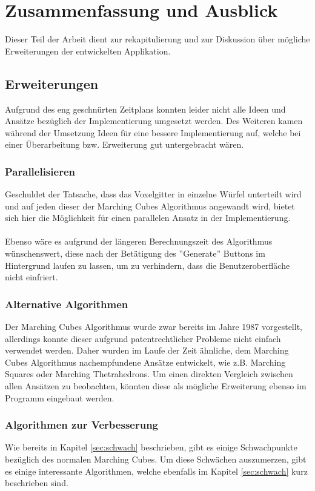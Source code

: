 \chapter{Zusammenfassung und Ausblick}
Dieser Teil der Arbeit dient zur rekapitulierung und zur Diskussion über mögliche Erweiterungen der entwickelten Applikation. 

\section{Erweiterungen}
Aufgrund des eng geschnürten Zeitplans konnten leider nicht alle Ideen und Ansätze bezüglich der Implementierung umgesetzt werden. Des Weiteren kamen während der Umsetzung Ideen für eine bessere Implementierung auf, welche bei einer Überarbeitung bzw. Erweiterung gut untergebracht wären.

\subsection{Parallelisieren}
Geschuldet der Tatsache, dass das Voxelgitter in einzelne Würfel unterteilt wird und auf jeden dieser der Marching Cubes Algorithmus angewandt wird, bietet sich hier die Möglichkeit für einen parallelen Ansatz in der Implementierung.\\
\\
Ebenso wäre es aufgrund der längeren Berechnungszeit des Algorithmus wünschenswert, diese nach der Betätigung des ''Generate'' Buttons im Hintergrund laufen zu lassen, um zu verhindern, dass die Benutzeroberfläche nicht einfriert.
\subsection{Alternative Algorithmen}
Der Marching Cubes Algorithmus wurde zwar bereits im Jahre 1987 vorgestellt, allerdings konnte dieser aufgrund patentrechtlicher Probleme nicht einfach verwendet werden. Daher wurden im Laufe der Zeit ähnliche, dem Marching Cubes Algorithmus nachempfundene Ansätze entwickelt, wie z.B. Marching Squares oder Marching Thetrahedrons. Um einen direkten Vergleich zwischen allen Ansätzen zu beobachten, könnten diese als mögliche Erweiterung ebenso im Programm eingebaut werden.
\subsection{Algorithmen zur Verbesserung} 
Wie bereits in Kapitel \ref{sec:schwach} beschrieben, gibt es einige Schwachpunkte bezüglich des normalen Marching Cubes. Um diese Schwächen auszumerzen, gibt es einige interessante Algorithmen, welche ebenfalls im Kapitel \ref{sec:schwach} kurz beschrieben sind. 

